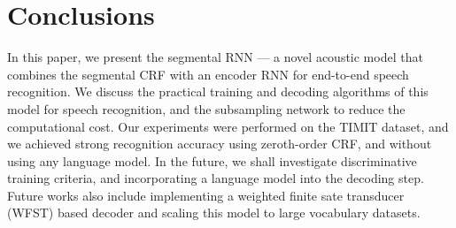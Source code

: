 \documentclass[a4paper]{article}
\begin{document}
\section{Conclusions}
In this paper, we present the segmental RNN --- a novel acoustic model that combines the segmental CRF with an encoder RNN for end-to-end speech recognition. We discuss the practical training and decoding algorithms of this model for speech recognition, and the subsampling network to reduce the computational cost. Our experiments were performed on the TIMIT dataset, and we achieved strong recognition accuracy using zeroth-order CRF, and without using any language model. In the future, we shall investigate discriminative training criteria, and incorporating a language model into the decoding step. Future works also include implementing a weighted finite sate transducer (WFST) based decoder and scaling this model to large vocabulary datasets.  

\newpage
\small


\end{document}
